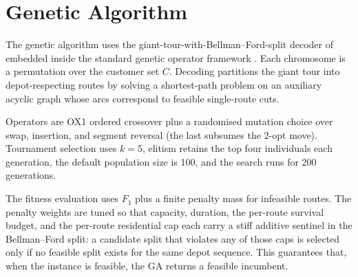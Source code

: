 \section{Genetic Algorithm}
\label{ch5:ga}

The genetic algorithm uses the giant-tour-with-Bellman--Ford-split
decoder of \citet{prins2004} embedded inside the standard genetic
operator framework \citep{holland1975}. Each chromosome is a
permutation over the customer set $C$. Decoding partitions the giant
tour into depot-respecting routes by solving a shortest-path problem
on an auxiliary acyclic graph whose arcs correspond to feasible
single-route cuts.

Operators are OX1 ordered crossover plus a randomised mutation choice
over swap, insertion, and segment reversal (the last subsumes the
2-opt move). Tournament selection uses $k = 5$, elitism retains the
top four individuals each generation, the default population size is
100, and the search runs for 200 generations.

The fitness evaluation uses $F_1$ plus a finite penalty mass for
infeasible routes. The penalty weights are tuned so that capacity,
duration, the per-route survival budget, and the per-route
residential cap each carry a stiff additive sentinel in the
Bellman--Ford split: a candidate split that violates any of those
caps is selected only if no feasible split exists for the same depot
sequence. This guarantees that, when the instance is feasible, the
GA returns a feasible incumbent.

